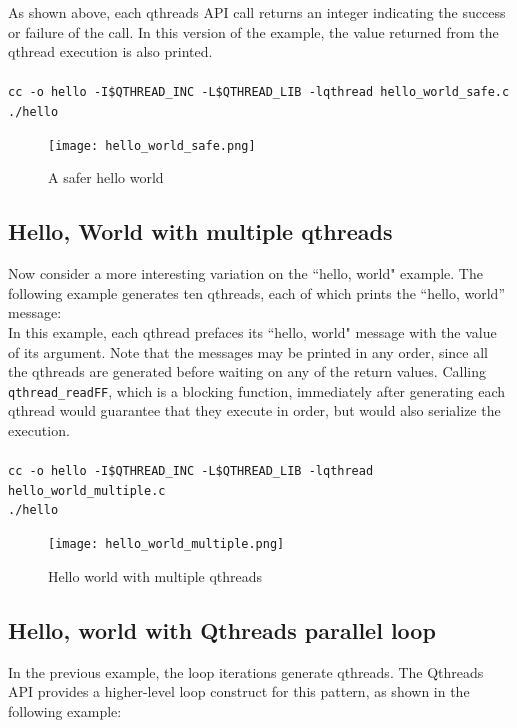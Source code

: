 \documentclass[12pt,fullpage]{article}
\begin{document}
As shown above, each qthreads API call returns an integer indicating the success or failure of the call. In this version of the example, the value returned from the qthread execution is also printed.
\\ \\
{\footnotesize{\tt cc -o hello -I\$QTHREAD\_INC -L\$QTHREAD\_LIB -lqthread hello\_world\_safe.c}}
\\
{\footnotesize{\tt ./hello}}
\begin{figure}[h]
\texttt{[image: hello\_world\_safe.png]}
\caption{A safer hello world}
\label{fig:hello_world_safe}
\end{figure}


\subsection{Hello, World with multiple qthreads}

Now consider a more interesting variation on the ``hello, world" example.  The following example generates ten qthreads, each of which prints the ``hello, world'' message:
\\


In this example, each qthread prefaces its ``hello, world" message with the value of its argument.  Note that the messages may be printed in any order, since all the qthreads are generated before waiting on any of the return values.  Calling {\tt qthread\_readFF}, which is a blocking function, immediately after generating each qthread would guarantee that they execute in order, but would also serialize the execution.
\\ \\
{\footnotesize{\tt cc -o hello -I\$QTHREAD\_INC -L\$QTHREAD\_LIB -lqthread hello\_world\_multiple.c}}
\\
{\footnotesize{\tt ./hello}}
\begin{figure}[h]
\texttt{[image: hello\_world\_multiple.png]}
\caption{Hello world with multiple qthreads}
\label{fig:hello_world_multiple}
\end{figure}

\subsection{Hello, world with Qthreads parallel loop}

In the previous example, the loop iterations generate qthreads.  The Qthreads API provides a higher-level loop construct for this pattern, as shown in the following example:
\\

\end{document}
